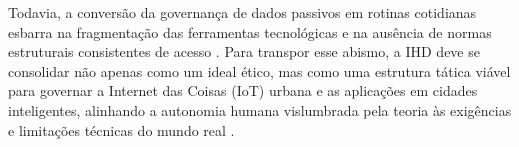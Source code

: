 \documentclass[
	12pt,				%
	oneside,			%
	a4paper,			%
	english,			%
	brazil				%
	]{abntex2ppgsi}
\begin{document}
    Todavia, a conversão da governança de dados passivos em rotinas cotidianas esbarra na fragmentação das ferramentas tecnológicas e na ausência de normas estruturais consistentes de acesso \cite{mu2024institutional}. Para transpor esse abismo, a IHD deve se consolidar não apenas como um ideal ético, mas como uma estrutura tática viável para governar a Internet das Coisas (IoT) urbana e as aplicações em cidades inteligentes, alinhando a autonomia humana vislumbrada pela teoria às exigências e limitações técnicas do mundo real \cite{DOWTHWAITE2024, DeBettio2023, calvetti2024human}.
\end{document}
